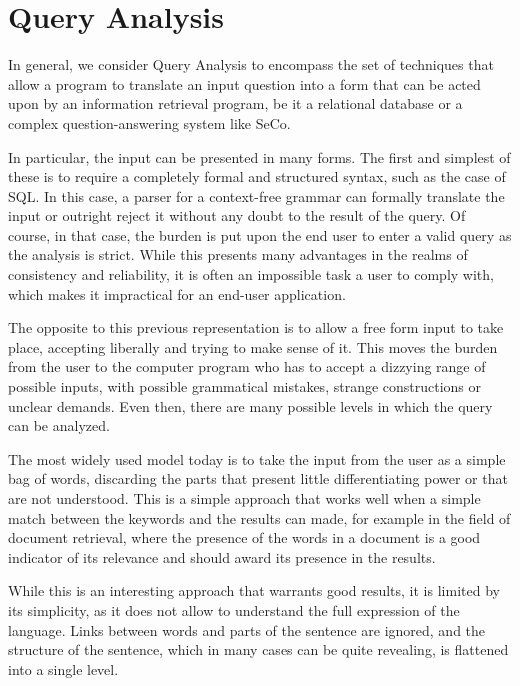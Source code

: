

\section{Query Analysis} %
\label{sec:query_analysis}

In general, we consider Query Analysis to encompass the set of techniques that allow a program to translate an input question into a form that can be acted upon by an information retrieval program, be it a relational database or a complex question-answering system like SeCo.

In particular, the input can be presented in many forms. The first and simplest of these is to require a completely formal and structured syntax, such as the case of SQL. In this case, a parser for a context-free grammar can formally translate the input or outright reject it without any doubt to the result of the query. Of course, in that case, the burden is put upon the end user to enter a valid query as the analysis is strict. While this presents many advantages in the realms of consistency and reliability, it is often an impossible task a user to comply with, which makes it impractical for an end-user application.

The opposite to this previous representation is to allow a free form input to take place, accepting liberally and trying to make sense of it. This moves the burden from the user to the computer program who has to accept a dizzying range of possible inputs, with possible grammatical mistakes, strange constructions or unclear demands. Even then, there are many possible levels in which the query can be analyzed.

The most widely used model today is to take the input from the user as a simple bag of words, discarding the parts that present little differentiating power or that are not understood. This is a simple approach that works well when a simple match between the keywords and the results can made, for example in the field of document retrieval, where the presence of the words in a document is a good indicator of its relevance and should award its presence in the results.

While this is an interesting approach that warrants good results, it is limited by its simplicity, as it does not allow to understand the full expression of the language. Links between words and parts of the sentence are ignored, and the structure of the sentence, which in many cases can be quite revealing, is flattened into a single level.

